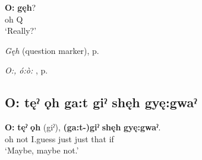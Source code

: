 \ea
\label{ex:opart1}
\gll \textbf{O:} \textbf{gęh}?\\
oh Q\\
\glt ‘Really?’
\z


\begin{CayugaRelated}
\item \textit{Gęh}  (question marker), p. \pageref{p:[gęh] `Q’}\\
\item \textit{O:, ó:ò:} , p. \pageref{p:[o:, ó:ò:]}
\end{CayugaRelated}

\subsection*{\textbf{O: tęˀ ǫh ga:t giˀ shęh gyę:gwaˀ} } \label{p:[o: tęˀ ǫh ga:t giˀ shęh gyę:gwaˀ]}

\ea
\label{ex:opart4}
\gll \textbf{O:} \textbf{tęˀ} \textbf{ǫh} (giˀ), \textbf{(ga:t-)giˀ} \textbf{shęh} \textbf{gyę:gwaˀ}.\\
oh not I.guess just just that if\\
\glt ‘Maybe, maybe not.’
\z

